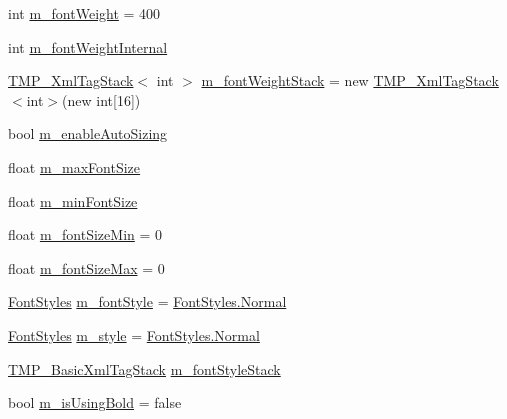 \begin{DoxyCompactItemize}
\item 
int \mbox{\hyperlink{class_t_m_pro_1_1_t_m_p___text_a65bbcd362d94fd456f6e41175b3e1fa2}{m\+\_\+font\+Weight}} = 400
\item 
int \mbox{\hyperlink{class_t_m_pro_1_1_t_m_p___text_ae873a31581a7ecaa5ebde0ad51601d21}{m\+\_\+font\+Weight\+Internal}}
\item 
\mbox{\hyperlink{struct_t_m_pro_1_1_t_m_p___xml_tag_stack}{T\+M\+P\+\_\+\+Xml\+Tag\+Stack}}$<$ int $>$ \mbox{\hyperlink{class_t_m_pro_1_1_t_m_p___text_a700d2eddd6bbf9cb5756b29f6b8e6bc4}{m\+\_\+font\+Weight\+Stack}} = new \mbox{\hyperlink{struct_t_m_pro_1_1_t_m_p___xml_tag_stack}{T\+M\+P\+\_\+\+Xml\+Tag\+Stack}}$<$int$>$(new int\mbox{[}16\mbox{]})
\item 
bool \mbox{\hyperlink{class_t_m_pro_1_1_t_m_p___text_ae03b329de891924d4f6699a651d2e8dd}{m\+\_\+enable\+Auto\+Sizing}}
\item 
float \mbox{\hyperlink{class_t_m_pro_1_1_t_m_p___text_ab5518687c6eec809a348059a3894f6f2}{m\+\_\+max\+Font\+Size}}
\item 
float \mbox{\hyperlink{class_t_m_pro_1_1_t_m_p___text_ab379c0ad5fc0f6e67b8226c83560b4a9}{m\+\_\+min\+Font\+Size}}
\item 
float \mbox{\hyperlink{class_t_m_pro_1_1_t_m_p___text_a44ebb77466dd58981e0d55d58f931746}{m\+\_\+font\+Size\+Min}} = 0
\item 
float \mbox{\hyperlink{class_t_m_pro_1_1_t_m_p___text_a3150edc89ccac43135fef3b847e750ee}{m\+\_\+font\+Size\+Max}} = 0
\item 
\mbox{\hyperlink{namespace_t_m_pro_aedf79b6e7e2ce2b9c9ac84e790596e7c}{Font\+Styles}} \mbox{\hyperlink{class_t_m_pro_1_1_t_m_p___text_aa158e46ce4739a66372d3f9467e80216}{m\+\_\+font\+Style}} = \mbox{\hyperlink{namespace_t_m_pro_aedf79b6e7e2ce2b9c9ac84e790596e7ca960b44c579bc2f6818d2daaf9e4c16f0}{Font\+Styles.\+Normal}}
\item 
\mbox{\hyperlink{namespace_t_m_pro_aedf79b6e7e2ce2b9c9ac84e790596e7c}{Font\+Styles}} \mbox{\hyperlink{class_t_m_pro_1_1_t_m_p___text_a129b38ef8dfc60ca1f1e0b1704bb663c}{m\+\_\+style}} = \mbox{\hyperlink{namespace_t_m_pro_aedf79b6e7e2ce2b9c9ac84e790596e7ca960b44c579bc2f6818d2daaf9e4c16f0}{Font\+Styles.\+Normal}}
\item 
\mbox{\hyperlink{struct_t_m_pro_1_1_t_m_p___basic_xml_tag_stack}{T\+M\+P\+\_\+\+Basic\+Xml\+Tag\+Stack}} \mbox{\hyperlink{class_t_m_pro_1_1_t_m_p___text_a024d1886e8eaba0a4a6668a7e8685f12}{m\+\_\+font\+Style\+Stack}}
\item 
bool \mbox{\hyperlink{class_t_m_pro_1_1_t_m_p___text_a72bf9a68aa56adc9713eaece271f0902}{m\+\_\+is\+Using\+Bold}} = false

\end{DoxyCompactItemize}
